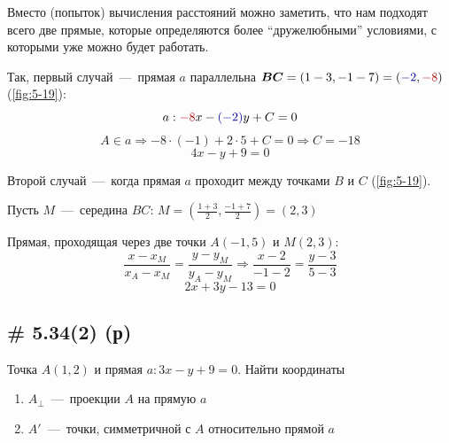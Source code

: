 \documentclass[a4paper,12pt]{article}
\begin{document}
\begin{solution}
    Вместо (попыток) вычисления расстояний можно заметить, что нам подходят всего две прямые, которые определяются более ``дружелюбными'' условиями, с которыми уже можно будет работать.
    
    Так, первый случай~---~прямая $a$ параллельна $\bds{BC} \hm= (1 - 3, -1 - 7) \hm= (\textcolor{my-blue}{-2}, \textcolor{my-red}{-8})$ (\ref{fig:5-19}):
    \[
      a: \textcolor{my-red}{-8} x - \textcolor{my-blue}{(-2)} y + C = 0
    \]
    \[
      A \in a \Rightarrow -8 \cdot (-1) + 2 \cdot 5 + C = 0 \Rightarrow C = -18
    \]
    \[
      \boxed{4x - y + 9 = 0}
    \]
      
    Второй случай~---~когда прямая $a$ проходит между точками $B$ и $C$ (\ref{fig:5-19}).
    
    Пусть $M$~---~середина $BC$:
    $
      M = \left(\frac{1 + 3}{2}, \frac{-1 + 7}{2}\right) = (2, 3)
    $
    
    Прямая, проходящая через две точки $A(-1, 5)$ и $M(2, 3)$:
    \[
      \frac{x - x_M}{x_A - x_M} = \frac{y - y_M}{y_A - y_M}
      \Rightarrow
      \frac{x - 2}{-1 - 2} = \frac{y - 3}{5 - 3}
    \]
    \[
      \boxed{2x + 3y - 13 = 0}
    \]
  \end{solution}
  
  
  \subsection{\# 5.34(2) (р)}
  
  \begin{problem}
    Точка $A(1, 2)$ и прямая $a: 3x - y + 9 = 0$.
    Найти координаты
    \begin{enumerate}
      \item $A_{\perp}$~---~проекции $A$ на прямую $a$
      \item $A'$~---~точки, симметричной с $A$ относительно прямой $a$
    \end{enumerate}
  \end{problem}
  
\end{document}
